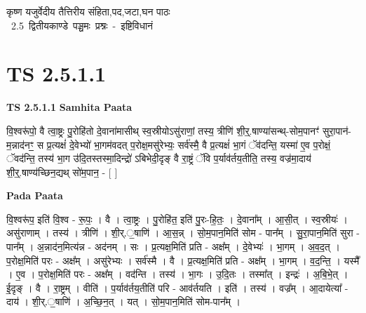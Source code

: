 \documentclass[17pt]{extarticle}
\begin{document}
\begin{titlepage}
    \begin{center}
 
\begin{sanskrit}
    { \Huge
    कृष्ण यजुर्वेदीय तैत्तिरीय संहिता,पद,जटा,घन पाठः 
    }
    \\
    \vspace{2.5cm}
    \mbox{ \Huge
    2.5      द्वितीयकाण्डे पञ्चमः प्रश्नः - इष्टिविधानं   }
\end{sanskrit}
\end{center}

\end{titlepage}
\tableofcontents
\pagebreak

\section*{ TS 2.5.1.1 }

\textbf{TS 2.5.1.1 } \newline
\textbf{Samhita Paata} \newline

वि॒श्वरू॑पो॒ वै त्वा॒ष्ट्रः पु॒रोहि॑तो दे॒वाना॑मासीथ् स्व॒स्रीयोऽसु॑राणां॒ तस्य॒ त्रीणि॑ शी॒र्॒.षाण्या॑सन्थ्-सोम॒पानꣳ॑ सुरा॒पान॑-म॒न्नाद॑नꣳ॒॒ स प्र॒त्यक्षं॑ दे॒वेभ्यो॑ भा॒गम॑वदत् प॒रोक्ष॒मसु॑रेभ्यः॒ सर्व॑स्मै॒ वै प्र॒त्यक्षं॑ भा॒गं ॅव॑दन्ति॒ यस्मा॑ ए॒व प॒रोक्षं॒ ॅवद॑न्ति॒ तस्य॑ भा॒ग उ॑दि॒तस्तस्मा॒दिन्द्रो॑ ऽबिभेदी॒दृङ् वै रा॒ष्ट्रं ॅवि प॒र्याव॑र्तय॒तीति॒ तस्य॒ वज्र॑मा॒दाय॑ शी॒र्॒.षाण्य॑च्छिन॒द्यथ् सो॑म॒पान॒ - [  ] \newline

\textbf{Pada Paata} \newline

वि॒श्वरू॑प॒ इति॑ वि॒श्व - रू॒पः॒ । वै । त्वा॒ष्ट्रः । पु॒रोहि॑त॒ इति॑ पु॒रः-हि॒तः॒ । दे॒वाना᳚म् । आ॒सी॒त् । स्व॒स्रीयः॑ । असु॑राणाम् । तस्य॑ । त्रीणि॑ । शी॒र्.॒षाणि॑ । आ॒स॒न्न् । सो॒म॒पान॒मिति॑ सोम - पान᳚म् । सु॒रा॒पान॒मिति॑ सुरा - पान᳚म् । अ॒न्नाद॑न॒मित्य॑न्न - अद॑नम् । सः । प्र॒त्यक्ष॒मिति॑ प्रति - अक्ष᳚म् । दे॒वेभ्यः॑ । भा॒गम् । अ॒व॒द॒त् । प॒रोक्ष॒मिति॑ परः - अक्ष᳚म् । असु॑रेभ्यः । सर्व॑स्मै । वै । प्र॒त्यक्ष॒मिति॑ प्रति - अक्ष᳚म् । भा॒गम् । व॒द॒न्ति॒ । यस्मै᳚ । ए॒व । प॒रोक्ष॒मिति॑ परः - अक्ष᳚म् । वद॑न्ति । तस्य॑ । भा॒गः । उ॒दि॒तः । तस्मा᳚त् । इन्द्रः॑ । अ॒बि॒भे॒त् । ई॒दृङ् । वै । रा॒ष्ट्रम् । वीति॑ । प॒र्याव॑र्तय॒तीति॑ परि - आव॑र्तयति । इति॑ । तस्य॑ । वज्र᳚म् । आ॒दायेत्या᳚ - दाय॑ । शी॒र्.॒षाणि॑ । अ॒च्छि॒न॒त् । यत् । सो॒म॒पान॒मिति॑ सोम-पान᳚म् ।  \newline
\end{document}
